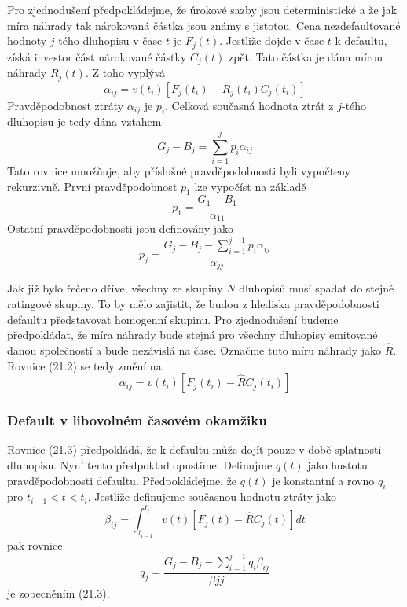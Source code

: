 \documentclass[a4paper]{book}
\begin{document}
Pro zjednodušení předpokládejme, že úrokové sazby jsou deterministické a že jak míra náhrady tak nárokovaná částka jsou známy s jistotou.
Cena nezdefaultované hodnoty $j$-tého dluhopisu v čase $t$ je $F_j(t)$. Jestliže dojde v čase $t$ k defaultu, získá investor část nárokované částky $C_j(t)$ zpět. Tato částka je dána mírou náhrady $R_j(t)$. Z toho vyplývá
\begin{equation}
\alpha_{ij} = v(t_i)[F_j(t_i)-R_j(t_i)C_j(t_i)]
\end{equation} 
Pravděpodobnost ztráty $\alpha_{ij}$ je $p_i$. Celková současná hodnota ztrát z $j$-tého dluhopisu je tedy dána vztahem
\begin{equation*}
G_j - B_j = \sum^{j}_{i=1}p_i \alpha_{ij}
\end{equation*}
Tato rovnice umožňuje, aby příslušné pravděpodobnosti byli vypočteny rekurzivně. První pravděpodobnost $p_1$ lze vypočíst na základě
\begin{equation*}
p_1 = \frac{G_1 - B_1}{\alpha_{11}}
\end{equation*}
Ostatní pravděpodobnosti jsou definovány jako
\begin{equation}
p_j = \frac{G_j - B_j - \sum^{j-1}_{i=1}p_i \alpha_{ij}}{\alpha_{jj}}
\end{equation}

Jak již bylo řečeno dříve, všechny ze skupiny $N$ dluhopisů musí spadat do stejné ratingové skupiny. To by mělo zajistit, že budou z hlediska pravděpodobnosti defaultu představovat homogenní skupinu. Pro zjednodušení budeme předpokládat, že míra náhrady bude stejná pro všechny dluhopisy emitované danou společností a bude nezávislá na čase. Označme tuto míru náhrady jako $\hat{R}$. Rovnice (21.2) se tedy změní na
\begin{equation*}
\alpha_{ij} = v(t_i)[F_j(t_i)-\hat{R}C_j(t_i)]
\end{equation*}

\subsubsection{Default v libovolném časovém okamžiku}

Rovnice (21.3) předpokládá, že k defaultu může dojít pouze v době splatnosti dluhopisu. Nyní tento předpoklad opustíme. Definujme $q(t)$ jako hustotu pravděpodobnosti defaultu. Předpokládejme, že $q(t)$ je konstantní a rovno $q_i$ pro $t_{i-1} < t < t_i$. Jestliže definujeme současnou hodnotu ztráty jako
\begin{equation*}
\beta_{ij} = \int^{t_i}_{t_{i-1}}v(t)[F_j(t)-\hat{R}C_j(t)]dt
\end{equation*}
pak rovnice
\begin{equation}
q_j = \frac{G_j - B_j - \sum^{j-1}_{i=1}q_i \beta_{ij}}{\beta{jj}}
\end{equation}
je zobecněním (21.3).
\end{document}
